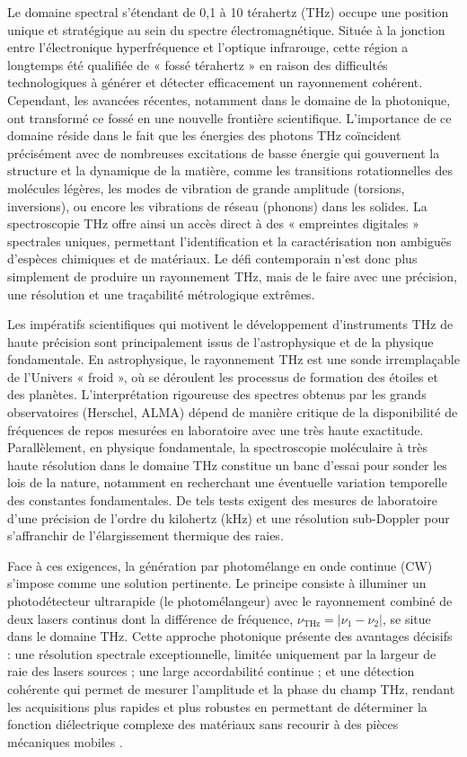 Le domaine spectral s'étendant de 0,1 à 10 térahertz (THz) occupe une position unique et stratégique au sein du spectre électromagnétique. Située à la jonction entre l'électronique hyperfréquence et l'optique infrarouge, cette région a longtemps été qualifiée de « fossé térahertz » en raison des difficultés technologiques à générer et détecter efficacement un rayonnement cohérent. Cependant, les avancées récentes, notamment dans le domaine de la photonique, ont transformé ce fossé en une nouvelle frontière scientifique. L'importance de ce domaine réside dans le fait que les énergies des photons THz coïncident précisément avec de nombreuses excitations de basse énergie qui gouvernent la structure et la dynamique de la matière, comme les transitions rotationnelles des molécules légères, les modes de vibration de grande amplitude (torsions, inversions), ou encore les vibrations de réseau (phonons) dans les solides. La spectroscopie THz offre ainsi un accès direct à des « empreintes digitales » spectrales uniques, permettant l'identification et la caractérisation non ambiguës d'espèces chimiques et de matériaux. Le défi contemporain n'est donc plus simplement de produire un rayonnement THz, mais de le faire avec une précision, une résolution et une traçabilité métrologique extrêmes.

Les impératifs scientifiques qui motivent le développement d'instruments THz de haute précision sont principalement issus de l'astrophysique et de la physique fondamentale. En astrophysique, le rayonnement THz est une sonde irremplaçable de l'Univers « froid », où se déroulent les processus de formation des étoiles et des planètes. L'interprétation rigoureuse des spectres obtenus par les grands observatoires (Herschel, ALMA) dépend de manière critique de la disponibilité de fréquences de repos mesurées en laboratoire avec une très haute exactitude. Parallèlement, en physique fondamentale, la spectroscopie moléculaire à très haute résolution dans le domaine THz constitue un banc d'essai pour sonder les lois de la nature, notamment en recherchant une éventuelle variation temporelle des constantes fondamentales. De tels tests exigent des mesures de laboratoire d'une précision de l'ordre du kilohertz (kHz) et une résolution sub-Doppler pour s'affranchir de l'élargissement thermique des raies.

Face à ces exigences, la génération par photomélange en onde continue (CW) s'impose comme une solution pertinente. Le principe consiste à illuminer un photodétecteur ultrarapide (le photomélangeur) avec le rayonnement combiné de deux lasers continus dont la différence de fréquence, $\nu_{\text{THz}} = |\nu_{1} - \nu_{2}|$, se situe dans le domaine THz. Cette approche photonique présente des avantages décisifs : une résolution spectrale exceptionnelle, limitée uniquement par la largeur de raie des lasers sources ; une large accordabilité continue ; et une détection cohérente qui permet de mesurer l'amplitude et la phase du champ THz, rendant les acquisitions plus rapides et plus robustes en permettant de déterminer la fonction diélectrique complexe des matériaux sans recourir à des pièces mécaniques mobiles \cite{Roggenbuck2010}.

